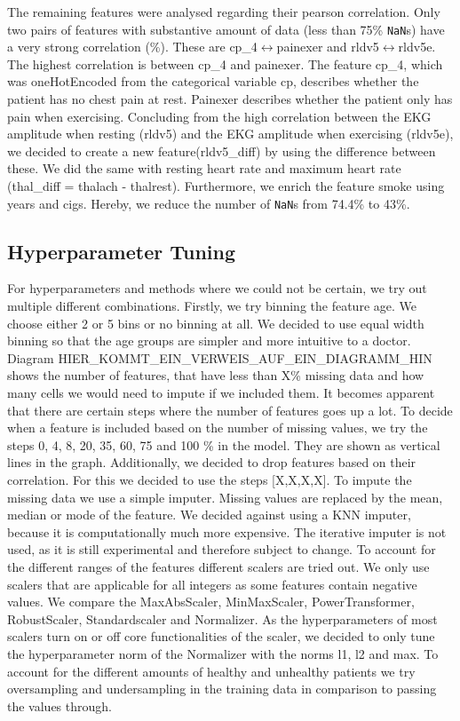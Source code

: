 The remaining features were analysed regarding their pearson correlation. Only two pairs of features with substantive amount of data (less than 75\% \texttt{NaN}s) have a very strong correlation (\%).  
These are cp\_4$\leftrightarrow$painexer and rldv5$\leftrightarrow$rldv5e. The highest correlation is between cp\_4 and painexer. The feature cp\_4, which was oneHotEncoded from the categorical variable cp, describes whether the patient has no chest pain at rest. Painexer describes whether the patient only has pain when exercising. 
Concluding from the high correlation between the EKG amplitude when resting (rldv5) and the EKG amplitude when exercising (rldv5e), we decided to create a new feature(rldv5_diff) by using the difference between these. We did the same with resting heart rate and maximum heart rate (thal_diff = thalach - thalrest). 
Furthermore, we enrich the feature smoke using years and cigs. Hereby, we reduce the number of \texttt{NaN}s from 74.4\% to 43\%. 

\subsection{Hyperparameter Tuning }
For hyperparameters and methods where we could not be certain, we try out multiple different combinations.
Firstly, we try binning the feature age. We choose either 2 or 5 bins or no binning at all. We decided to use equal width binning so that the age groups are simpler and more intuitive to a doctor.
Diagram HIER\_KOMMT\_EIN\_VERWEIS\_AUF\_EIN\_DIAGRAMM\_HIN shows the number of features, that have less than X\% missing data and how many cells we would need to impute if we included them. It becomes apparent that there are certain steps where the number of features goes up a lot. To decide when a feature is included based on the number of missing values, we try the steps 0, 4, 8, 20, 35, 60, 75 and 100 \% in the model. They are shown as vertical lines in the graph. Additionally, we decided to drop features based on their correlation. For this we decided to use the steps [X,X,X,X].
To impute the missing data we use a simple imputer. Missing values are replaced by the mean, median or mode of the feature. We decided against using a KNN imputer, because it is computationally much more expensive. The iterative imputer is not used, as it is still experimental and therefore subject to change.
To account for the different ranges of the features different scalers are tried out. We only use scalers that are applicable for all integers as some features contain negative values. 
We compare the MaxAbsScaler, MinMaxScaler, PowerTransformer, RobustScaler, Standardscaler and Normalizer. As the hyperparameters of most scalers turn on or off core functionalities of the scaler, we decided to only tune the hyperparameter norm of the Normalizer with the norms l1, l2 and max.
To account for the different amounts of healthy and unhealthy patients we try oversampling and undersampling in the training data in comparison to passing the values through.




